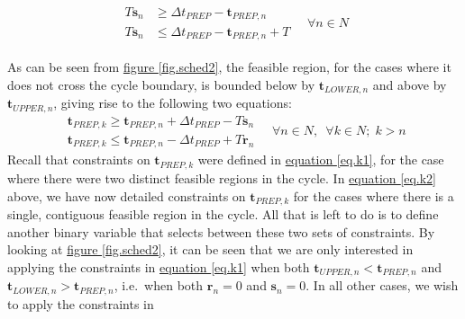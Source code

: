 \begin{equation}
    \begin{split}
        \begin{alignedat}{2}
            T \boldsymbol{s}_{n} &\ge \Delta t_{\mathit{PREP}}
            - \boldsymbol{t}_{\mathit{PREP},n}\\
            T \boldsymbol{s}_{n} &\le \Delta t_{\mathit{PREP}} 
            -\boldsymbol{t}_{\mathit{PREP},n} + T
        \end{alignedat}
        \quad \forall n \in N
    \end{split}
    \label{eq.s}
\end{equation}

As can be seen from \hyperref[fig.sched2]{figure \ref*{fig.sched2}},
the feasible region, for the cases  where it does not cross the cycle boundary,
is bounded below by $\boldsymbol{t}_{\mathit{LOWER},n}$ and above by
$\boldsymbol{t}_{\mathit{UPPER},n}$, giving rise to the following two
equations:
\begin{equation}
    \begin{split}
        \boldsymbol{t}_{\mathit{PREP},k} \ge \boldsymbol{t}_{\mathit{PREP},n}
        + \Delta t_{\mathit{PREP}} - T \boldsymbol{s}_{n}\\
        \boldsymbol{t}_{\mathit{PREP},k} \le \boldsymbol{t}_{\mathit{PREP},n}
        - \Delta t_{\mathit{PREP}} + T \boldsymbol{r}_{n}
    \end{split}
    \quad \forall n \in N, \enspace \forall k \in N; \; k > n
    \label{eq.k2}
\end{equation}
Recall that constraints on $\boldsymbol{t}_{\mathit{PREP},k}$ were defined in
\hyperref[eq.k1]{equation \ref*{eq.k1}}, for the case where there were two
distinct feasible regions in the cycle.
In \hyperref[eq.k2]{equation \ref*{eq.k2}} above, we have now detailed
constraints on $\boldsymbol{t}_{\mathit{PREP},k}$ for the cases where there is
a single, contiguous feasible region in the cycle.
All that is left to do is to define another binary variable that selects
between these two sets of constraints.
By looking at \hyperref[fig.sched2]{figure \ref*{fig.sched2}}, it can be seen
that we are only interested in applying the constraints in 
\hyperref[eq.k1]{equation \ref*{eq.k1}} when both
$\boldsymbol{t}_{\mathit{UPPER},n} < \boldsymbol{t}_{\mathit{PREP},n}$ and
$\boldsymbol{t}_{\mathit{LOWER},n} > \boldsymbol{t}_{\mathit{PREP},n}$, i.e.\
when both $\boldsymbol{r}_{n} = 0$ and $\boldsymbol{s}_{n} = 0$.
In all other cases, we wish to apply the constraints in
